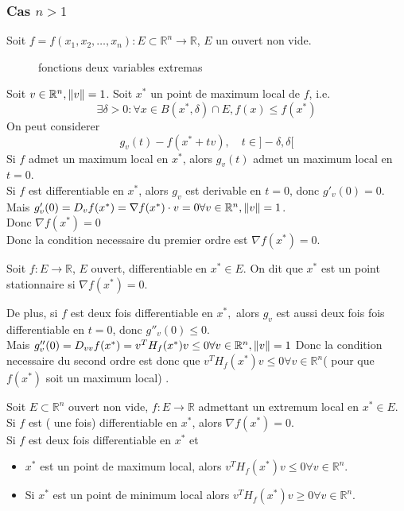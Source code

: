 \documentclass[../main.tex]{subfiles}
\begin{document}
\subsubsection{Cas $n>1$}
Soit $f= f( x_1, x_2, \ldots, x_n) : E \subset \mathbb{R}^n \to \mathbb{R}$,  $E$ un ouvert non vide.
\begin{figure}[H]
    \centering
    \caption{fonctions deux variables extremas}
    \label{fig:fonctions-deux-variables-extremas}
\end{figure}
Soit $v \in \mathbb{R}^{n}, \left\lVert v\right\rVert =1$. Soit $x^{*}$ un point de maximum local de $f$, i.e.
\[ 
	\exists \delta>0 : \forall x \in B( x^{*}, \delta) \cap E, f( x) \leq  f( x^{*}) 
\]
On peut considerer 
\[ 
	g_v( t) - f( x^{*}+ tv) , \quad t \in ]-\delta, \delta[
\]
Si $f$ admet un maximum local en $x^{*}$, alors $g_v( t) $ admet un maximum local en $t=0$.\\
Si $f$ est differentiable en $x^{*}$, alors $g_v$ est derivable en $t=0$, donc $g'_v( 0) =0$.\\
Mais $g'_v( 0)= D_v f( x^{*}) = \nabla f( x^{*}) \cdot v =0 \forall v \in \mathbb{R}^{n}, \left\lVert v\right\rVert =1$.\\
Donc $\nabla f( x^{*}) =0$ \\
Donc la condition necessaire du premier ordre est $\nabla f( x^{*}) =0$.\\
\begin{defn}
	Soit $f: E \to \mathbb{R}$, $E$ ouvert, differentiable en $x^{*}\in E$. On dit que $x^{*}$ est un point stationnaire si $\nabla f( x^{*}) =0$.
\end{defn}
De plus, si $f$ est deux fois differentiable en $x^{*},$ alors $g_v$ est aussi deux fois fois differentiable en $t=0$, donc $g''_v(0) \leq  0$.\\
Mais $g''_v( 0) = D_{vv} f( x^{*}) = v^{T}H_f( x^{*}) v \leq 0 \forall v \in \mathbb{R}^n, \left\lVert v\right\rVert =1$
Donc la condition necessaire du second ordre est donc que $v^{T}H_f( x^{*}) v \leq  0\forall v \in \mathbb{R}^n	$( pour que $f( x^{*}) $ soit un maximum local) .
\begin{thm}
	Soit $E \subset \mathbb{R}^n$ ouvert non vide, $f: E \to \mathbb{R}$ admettant un extremum local en $x^{*}\in E$.\\
	Si $f$ est ( une fois) differentiable en $x^{*}$, alors $\nabla f( x^{*}) =0.$ \\
	Si $f$ est deux fois differentiable en $x^{*}$ et 
	\begin{itemize}
		\item $x^{*}$ est un point de maximum local, alors $v^{T}H_f( x^{*}) v \leq 0 \forall v \in \mathbb{R}^n$.
		\item Si $x^{*}$ est un point de minimum local alors $v^{T}H_f( x^{*}) v \geq 0 \forall v \in \mathbb{R}^n$.
	\end{itemize}
		
\end{thm}
\end{document}
